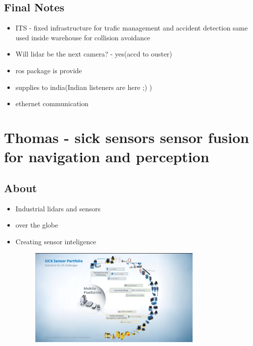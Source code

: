 \documentclass[a4paper]{article}
\begin{document}
\subsection{Final Notes}
\begin{itemize}

	\item ITS - fixed infrastructure for trafic management and accident detection same used inside warehouse for collision avoidance
	\item Will lidar be the next camera? - yes(accd to ouster)
	\item ros package is provide
	\item supplies to india(Indian listeners are here ;)  )
	\item ethernet communication
\end{itemize}
\newpage
\section{Thomas - sick sensors sensor fusion for navigation and perception}
\subsection{About}
\begin{itemize}
	\item Industrial lidars and sensors
	\item over the globe
	\item Creating sensor inteligence
	      \begin{figure}[htpb]
		      \centering
		      \includegraphics[width=0.8\textwidth]{sensotPortfolio.png}
		      \caption{}
		      \label{fig:}
	      \end{figure}
\end{itemize}
\end{document}
